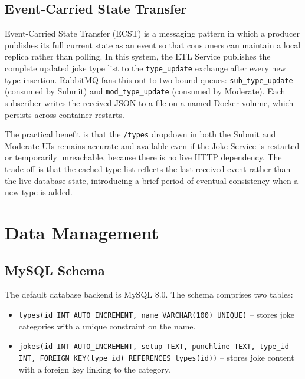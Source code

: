 \documentclass[12pt,a4paper]{article}
\begin{document}
\subsection{Event-Carried State Transfer}

Event-Carried State Transfer (ECST) is a messaging pattern in which a producer publishes its full current state as an event so that consumers can maintain a local replica rather than polling. In this system, the ETL Service publishes the complete updated joke type list to the \texttt{type\_update} exchange after every new type insertion. RabbitMQ fans this out to two bound queues: \texttt{sub\_type\_update} (consumed by Submit) and \texttt{mod\_type\_update} (consumed by Moderate). Each subscriber writes the received JSON to a file on a named Docker volume, which persists across container restarts.

The practical benefit is that the \texttt{/types} dropdown in both the Submit and Moderate UIs remains accurate and available even if the Joke Service is restarted or temporarily unreachable, because there is no live HTTP dependency. The trade-off is that the cached type list reflects the last received event rather than the live database state, introducing a brief period of eventual consistency when a new type is added.

\section{Data Management}

\subsection{MySQL Schema}

The default database backend is MySQL 8.0. The schema comprises two tables:

\begin{itemize}[leftmargin=2em, itemsep=2pt]
  \item \texttt{types(id INT AUTO\_INCREMENT, name VARCHAR(100) UNIQUE)} -- stores joke categories with a unique constraint on the name.
  \item \texttt{jokes(id INT AUTO\_INCREMENT, setup TEXT, punchline TEXT, type\_id INT, FOREIGN KEY(type\_id) REFERENCES types(id))} -- stores joke content with a foreign key linking to the category.
\end{itemize}
\end{document}
